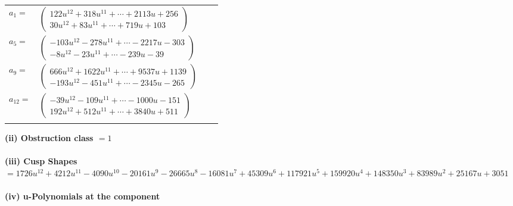 \documentclass[1p]{elsarticle_modified}
\theoremstyle{definition}
\begin{document}
\begin{tabular}{m{7pt} m{180pt} m{7pt} m{180pt} }
\flushright $a_{1}=$&$\begin{pmatrix}122 u^{12}+318 u^{11}+\cdots+2113 u+256\\30 u^{12}+83 u^{11}+\cdots+719 u+103\end{pmatrix}$ \\
\flushright $a_{5}=$&$\begin{pmatrix}-103 u^{12}-278 u^{11}+\cdots-2217 u-303\\-8 u^{12}-23 u^{11}+\cdots-239 u-39\end{pmatrix}$ \\
\flushright $a_{9}=$&$\begin{pmatrix}666 u^{12}+1622 u^{11}+\cdots+9537 u+1139\\-193 u^{12}-451 u^{11}+\cdots-2345 u-265\end{pmatrix}$ \\
\flushright $a_{12}=$&$\begin{pmatrix}-39 u^{12}-109 u^{11}+\cdots-1000 u-151\\192 u^{12}+512 u^{11}+\cdots+3840 u+511\end{pmatrix}$\\&\end{tabular}
\flushleft \textbf{(ii) Obstruction class $= 1$}\\~\\
\flushleft \textbf{(iii) Cusp Shapes $= 1726 u^{12}+4212 u^{11}-4090 u^{10}-20161 u^9-26665 u^8-16081 u^7+45309 u^6+117921 u^5+159920 u^4+148350 u^3+83989 u^2+25167 u+3051$}\\~\\
\newpage\renewcommand{\arraystretch}{1}
\flushleft \textbf{(iv) u-Polynomials at the component}\newline \\
\end{document}
